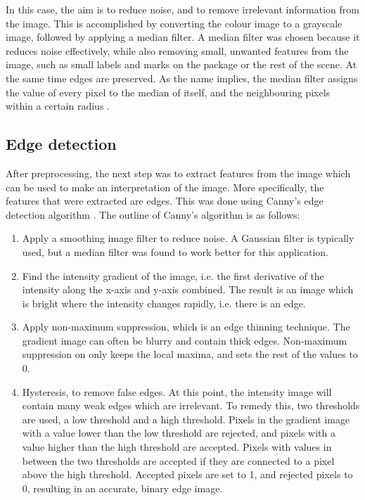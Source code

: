 In this case, the aim is to reduce noise, and to remove irrelevant information from the image.
This is accomplished by converting the colour image to a grayscale image, followed by applying a median filter. 
A median filter was chosen because it reduces noise effectively, while also removing small, unwanted features from the image, such as small labels and marks on the package or the rest of the scene.
At the same time edges are preserved.
As the name implies, the median filter assigns the value of every pixel to the median of itself, and the neighbouring pixels within a certain radius \cite{huang1979fast}.

\subsection{Edge detection} \label{method:edge_detection}
After preprocessing, the next step was to extract features from the image which can be used to make an interpretation of the image.
More specifically, the features that were extracted are edges. 
This was done using Canny's edge detection algorithm \cite{canny}. %
The outline of Canny's algorithm is as follows:
\begin{enumerate}
	\item Apply a smoothing image filter to reduce noise. A Gaussian filter is typically used, but a median filter was found to work better for this application.
	\item Find the intensity gradient of the image, i.e. the first derivative of the intensity along the x-axis and y-axis combined. The result is an image which is bright where the intensity changes rapidly, i.e. there is an edge.
	\item Apply non-maximum suppression, which is an edge thinning technique. The gradient image can often be blurry and contain thick edges. Non-maximum suppression on only keeps the local maxima, and sets the rest of the values to 0.
	\item Hysteresis, to remove false edges. At this point, the intensity image will contain many weak edges which are irrelevant. To remedy this, two thresholds are used, a low threshold and a high threshold. Pixels in the gradient image with a value lower than the low threshold are rejected, and pixels with a value  higher than the high threshold are accepted. Pixels with values in between the two thresholds are accepted if they are connected to a pixel above the high threshold. Accepted pixels are set to 1, and rejected pixels to 0, resulting in an accurate, binary edge image.
\end{enumerate}

